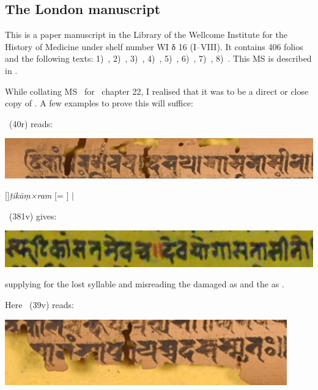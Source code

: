 \medskip
\subsection{The London manuscript}

This is a paper manuscript in the
Library of the Wellcome Institute for the History of Medicine
under shelf number WI δ 16 (I--VIII). 
It contains 406 folios and the following texts: 
1)~\SDhS, 
2)~\SDhU,
3)~\SDhSangr, 
4)~\Ums,
5)~\SivaUp,
6)~\Uums,
7)~\Vss,
8)~\DharmP.
This MS is described in .

While collating MS \msL\ for \VSS\ chapter 22, 
I realised that it was to be a direct or close copy of \msNa. 
A few examples to prove this will suffice:

\msNa\ (\fol40r) reads: 
\smallskip

\includegraphics[scale=.3]{images/dasayoga_msNa.png}

\smallskip

\hspace{2em}[]\textit{ṭikāṃ×ram} [= ]  $|$ 

\medskip

\msL\ (\fol381v) gives:
\smallskip

\includegraphics[scale=.3]{images/dasayoga_msL.png}
\smallskip

\hspace{2em}

\smallskip
\noindent
supplying  for the lost syllable and misreading the 
damaged  as  and the  as .


\bigskip
\bigskip

Here \msNa\ (\fol39v) reads:

\smallskip
\includegraphics[scale=.5]{images/japoyoga_msNa.png}

